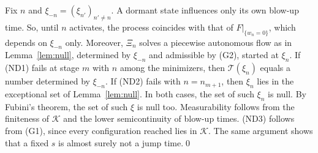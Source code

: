\documentclass[11pt]{article}
\theoremstyle{definition}
\theoremstyle{remark}
\newcommand{\cK}{\mathcal{K}}
\newcommand{\cT}{\mathcal{T}}
\newcommand{\ND}[1]{\textup{(ND#1)}}
\begin{document}
Fix $n$ and $\xi_{-n}=(\xi_{n'})_{n'\ne n}$. A dormant state influences only its own blow-up time. So, until $n$ activates, the process coincides with that of $F|_{\{w_n=0\}}$, which depends on $\xi_{-n}$ only. Moreover, $\Xi_n$ solves a piecewise autonomous flow as in Lemma~\ref{lem:null}, determined by $\xi_{-n}$ and admissible by (G2), started at $\xi_n$. If \ND1 fails at stage $m$ with $n$ among the minimizers, then $\cT(\xi_n)$ equals a number determined by $\xi_{-n}$. If \ND2 fails with $n=n_{m+1}$, then $\xi_n$ lies in the exceptional set of Lemma~\ref{lem:null}. In both cases, the set of such $\xi_n$ is null. By Fubini's theorem, the set of such $\xi$ is null too. Measurability follows from the finiteness of $\cK$ and the lower semicontinuity of blow-up times. \ND3 follows from (G1), since every configuration reached lies in $\cK$. The same argument shows that a fixed $s$ is almost surely not a jump time.\qed
\end{document}
